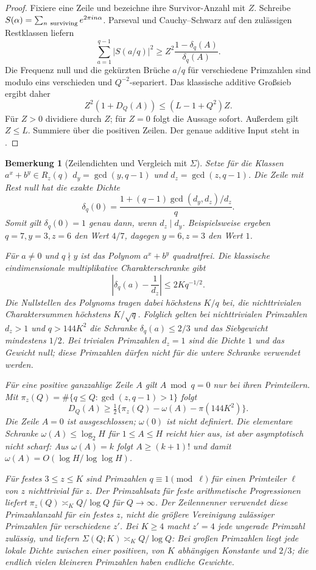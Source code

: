 \documentclass[11pt,a4paper]{article}
\newtheorem{remark}[theorem]{Bemerkung}
\begin{document}
\begin{proof}
Fixiere eine Zeile und bezeichne ihre Survivor-Anzahl mit $Z$.
Schreibe $S(\alpha)=\sum_{n\ {\rm surviving}}e^{2\pi i n\alpha}$.
Parseval und Cauchy--Schwarz auf den zulässigen Restklassen liefern
\[
 \sum_{a=1}^{q-1}|S(a/q)|^2
       \ge Z^2\frac{1-\delta_q(A)}{\delta_q(A)}.
\]
Die Frequenz null und die gekürzten Brüche $a/q$ für verschiedene
Primzahlen sind modulo eins verschieden und $Q^{-2}$-separiert.
Das klassische additive Großsieb
\cite{Bombieri1971,KedlayaANT} ergibt daher
\[
 Z^2(1+D_Q(A))\le(L-1+Q^2)Z.
\]
Für $Z>0$ dividiere durch $Z$; für $Z=0$ folgt die Aussage sofort.
Außerdem gilt $Z\le L$. Summiere über die positiven Zeilen.
Der genaue additive Input steht in
\cite[Satz~18.1]{KedlayaANT}.
\end{proof}

\begin{remark}[Zeilendichten und Vergleich mit $\Sigma$]
\label{rem:Sigma-comparison}
Setze für die Klassen $a^x+b^y\in R_z(q)$
$d_y=\gcd(y,q-1)$ und $d_z=\gcd(z,q-1)$.
Die Zeile mit Rest null hat die exakte Dichte
\[
 \delta_q(0)=
 \frac{1+(q-1)\gcd(d_y,d_z)/d_z}{q}.
\]
Somit gilt $\delta_q(0)=1$ genau dann, wenn $d_z\mid d_y$.
Beispielsweise ergeben $q=7,y=3,z=6$ den Wert $4/7$,
dagegen $y=6,z=3$ den Wert $1$.

Für $a\ne0$ und $q\nmid y$ ist das Polynom $a^x+b^y$ quadratfrei.
Die klassische eindimensionale multiplikative Charakterschranke gibt
\[
 \left|\delta_q(a)-\frac1{d_z}\right|\le2Kq^{-1/2}.
\]
Die Nullstellen des Polynoms tragen dabei höchstens $K/q$ bei,
die nichttrivialen Charaktersummen höchstens $K/\sqrt q$.
Folglich gelten bei \emph{nichttrivialen} Primzahlen $d_z>1$ und
$q>144K^2$ die Schranke $\delta_q(a)\le2/3$ und das Siebgewicht
mindestens $1/2$. Bei trivialen Primzahlen $d_z=1$ sind die Dichte
$1$ und das Gewicht null; diese Primzahlen dürfen nicht für die
untere Schranke verwendet werden.

Für eine positive ganzzahlige Zeile $A$ gilt $A\bmod q=0$ nur
bei ihren Primteilern. Mit
$\pi_z(Q)=\#\{q\le Q:\gcd(z,q-1)>1\}$ folgt
\[
 D_Q(A)\ge
 \tfrac12\{\pi_z(Q)-\omega(A)-\pi(144K^2)\}.
\]
Die Zeile $A=0$ ist ausgeschlossen; $\omega(0)$ ist nicht definiert.
Die elementare Schranke $\omega(A)\le\log_2 H$ für $1\le A\le H$
reicht hier aus, ist aber asymptotisch nicht scharf:
Aus $\omega(A)=k$ folgt $A\ge(k+1)!$ und damit
$\omega(A)=O(\log H/\log\log H)$.

Für festes $3\le z\le K$ sind Primzahlen $q\equiv1\pmod{\ell}$
für einen Primteiler $\ell$ von $z$ nichttrivial für $z$.
Der Primzahlsatz für feste arithmetische Progressionen
\cite[Satz~4.12]{KedlayaANT} liefert
$\pi_z(Q)\asymp_K Q/\log Q$ für $Q\to\infty$.
Der Zeilennenner verwendet diese Primzahlanzahl für ein
\emph{festes $z$}, nicht die größere Vereinigung zulässiger
Primzahlen für verschiedene $z'$.
Bei $K\ge4$ macht $z'=4$ jede ungerade Primzahl zulässig, und
 liefern
$\Sigma(Q;K)\asymp_K Q/\log Q$: Bei großen Primzahlen liegt jede
lokale Dichte zwischen einer positiven, von $K$ abhängigen Konstante
und $2/3$; die endlich vielen kleineren Primzahlen haben endliche
Gewichte.


\end{remark}
\end{document}
